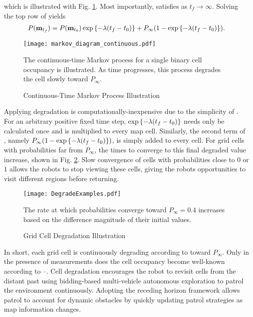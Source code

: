which is illustrated with Fig. \ref{fig:MarkovDegradeContinuous}. Most importantly,  satisfies  as $t_f\rightarrow\infty$. Solving the top row of  yields
\begin{align}
\label{eqn:CellDegradationScalar}
P(\mathbf{m}_{t_f})=P(\mathbf{m}_{t_0})\exp\left\{ -\lambda (t_f-t_0) \right\}+P_\infty(1-\exp\left\{ -\lambda (t_f-t_0) \right\}).
\end{align}

\begin{figure}
\centering
\texttt{[image: markov\_diagram\_continuous.pdf]}
\caption{Continuous-Time Markov Process Illustration}
\medskip
\small
The continuous-time Markov process for a single binary cell occupancy is illustrated. As time progresses, this process degrades the cell slowly toward $P_\infty.$
\label{fig:MarkovDegradeContinuous}
\end{figure}

Applying degradation is computationally-inexpensive due to the simplicity of . For an arbitrary positive fixed time step, $\exp\left\{ -\lambda (t_f-t_0) \right\}$ needs only be calculated once and is multiplied to every map cell. Similarly, the second term of , namely $P_\infty(1-\exp\left\{ -\lambda (t_f-t_0) \right\})$, is simply added to every cell. For grid cells with probabilities far from $P_\infty$, the times to converge to this final degraded value increase, shown in Fig. \ref{fig:DegradeExamples}. Slow convergence of cells with probabilities close to $0$ or $1$ allows the robots to stop viewing these cells, giving the robots opportunities to visit different regions before returning.

\begin{figure}
	\centering
	\texttt{[image: DegradeExamples.pdf]}
	\caption{Grid Cell Degradation Illustration}
	\medskip
	\small
	The rate at which probabilities converge toward $P_\infty=0.4$ increases based on the difference magnitude of their initial values.
	\label{fig:DegradeExamples}
\end{figure}

In short, each grid cell is continuously degrading according to  toward $P_\infty$. Only in the presence of measurements does the cell occupancy become well-known according to --. Cell degradation encourages the robot to revisit cells from the distant past using bidding-based multi-vehicle autonomous exploration to patrol the environment continuously. Adopting the receding horizon framework allows patrol to account for dynamic obstacles by quickly updating patrol strategies as map information changes.


